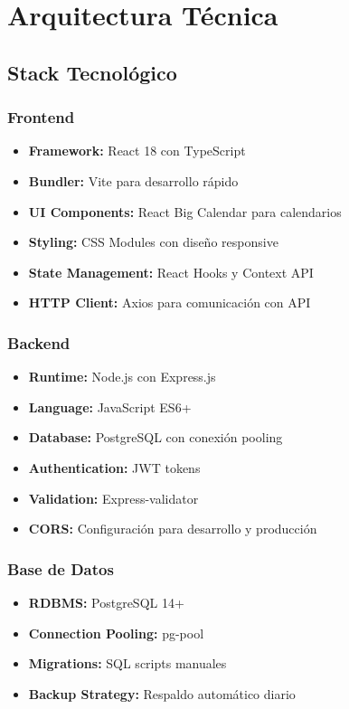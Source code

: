 \documentclass[12pt,a4paper]{article}
\begin{document}
\section{Arquitectura Técnica}

\subsection{Stack Tecnológico}

\subsubsection{Frontend}
\begin{itemize}
    \item \textbf{Framework:} React 18 con TypeScript
    \item \textbf{Bundler:} Vite para desarrollo rápido
    \item \textbf{UI Components:} React Big Calendar para calendarios
    \item \textbf{Styling:} CSS Modules con diseño responsive
    \item \textbf{State Management:} React Hooks y Context API
    \item \textbf{HTTP Client:} Axios para comunicación con API
\end{itemize}

\subsubsection{Backend}
\begin{itemize}
    \item \textbf{Runtime:} Node.js con Express.js
    \item \textbf{Language:} JavaScript ES6+
    \item \textbf{Database:} PostgreSQL con conexión pooling
    \item \textbf{Authentication:} JWT tokens
    \item \textbf{Validation:} Express-validator
    \item \textbf{CORS:} Configuración para desarrollo y producción
\end{itemize}

\subsubsection{Base de Datos}
\begin{itemize}
    \item \textbf{RDBMS:} PostgreSQL 14+
    \item \textbf{Connection Pooling:} pg-pool
    \item \textbf{Migrations:} SQL scripts manuales
    \item \textbf{Backup Strategy:} Respaldo automático diario
\end{itemize}
\end{document}

